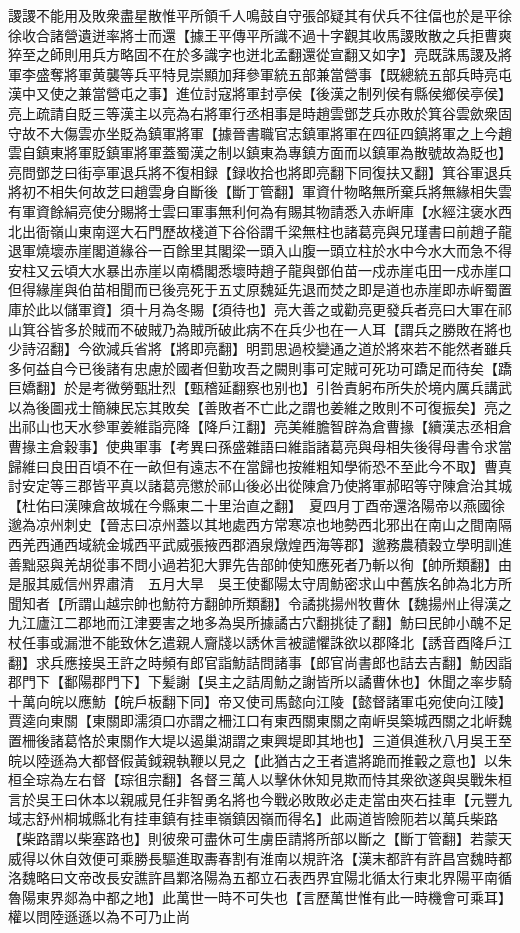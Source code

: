 謖謖不能用及敗衆盡星散惟平所領千人鳴鼓自守張郃疑其有伏兵不往偪也於是平徐徐收合諸營遺迸率將士而還【據王平傳平所識不過十字觀其收馬謖敗散之兵拒曹爽猝至之師則用兵方略固不在於多識字也迸北孟翻還從宣翻又如字】亮既誅馬謖及將軍李盛奪將軍黄襲等兵平特見崇顯加拜參軍統五部兼當營事【既總統五部兵時亮屯漢中又使之兼當營屯之事】進位討寇將軍封亭侯【後漢之制列侯有縣侯鄉侯亭侯】亮上疏請自貶三等漢主以亮為右將軍行丞相事是時趙雲鄧芝兵亦敗於箕谷雲歛衆固守故不大傷雲亦坐貶為鎮軍將軍【據晉書職官志鎮軍將軍在四征四鎮將軍之上今趙雲自鎮東將軍貶鎮軍將軍蓋蜀漢之制以鎮東為專鎮方面而以鎮軍為散號故為貶也】亮問鄧芝曰街亭軍退兵將不復相録【録收拾也將即亮翻下同復扶又翻】箕谷軍退兵將初不相失何故芝曰趙雲身自斷後【斷丁管翻】軍資什物略無所棄兵將無緣相失雲有軍資餘絹亮使分賜將士雲曰軍事無利何為有賜其物請悉入赤㟁庫【水經注褒水西北出衙嶺山東南逕大石門歷故棧道下谷俗謂千梁無柱也諸葛亮與兄瑾書曰前趙子龍退軍燒壞赤崖閣道緣谷一百餘里其閣梁一頭入山腹一頭立柱於水中今水大而急不得安柱又云頃大水暴出赤崖以南橋閣悉壞時趙子龍與鄧伯苗一戍赤崖屯田一戍赤崖口但得緣崖與伯苗相聞而已後亮死于五丈原魏延先退而焚之即是道也赤崖即赤㟁蜀置庫於此以儲軍資】須十月為冬賜【須待也】亮大善之或勸亮更發兵者亮曰大軍在祁山箕谷皆多於賊而不破賊乃為賊所破此病不在兵少也在一人耳【謂兵之勝敗在將也少詩沼翻】今欲減兵省將【將即亮翻】明罰思過校變通之道於將來若不能然者雖兵多何益自今已後諸有忠慮於國者但勤攻吾之闕則事可定賊可死功可蹻足而待矣【蹻巨嬌翻】於是考微勞甄壯烈【甄稽延翻察也别也】引咎責躬布所失於境内厲兵講武以為後圖戎士簡練民忘其敗矣【善敗者不亡此之謂也姜維之敗則不可復振矣】亮之出祁山也天水參軍姜維詣亮降【降戶江翻】亮美維膽智辟為倉曹掾【續漢志丞相倉曹掾主倉穀事】使典軍事【考異曰孫盛雜語曰維詣諸葛亮與母相失後得母書令求當歸維曰良田百頃不在一畝但有遠志不在當歸也按維粗知學術恐不至此今不取】曹真討安定等三郡皆平真以諸葛亮懲於祁山後必出從陳倉乃使將軍郝昭等守陳倉治其城【杜佑曰漢陳倉故城在今縣東二十里治直之翻】　夏四月丁酉帝還洛陽帝以燕國徐邈為凉州刺史【晉志曰凉州蓋以其地處西方常寒凉也地勢西北邪出在南山之間南隔西羌西通西域統金城西平武威張掖西郡酒泉燉煌西海等郡】邈務農積穀立學明訓進善黜惡與羌胡從事不問小過若犯大罪先告部帥使知應死者乃斬以徇【帥所類翻】由是服其威信州界肅清　五月大旱　吳王使鄱陽太守周魴密求山中舊族名帥為北方所聞知者【所謂山越宗帥也魴符方翻帥所類翻】令譎挑揚州牧曹休【魏揚州止得漢之九江廬江二郡地而江津要害之地多為吳所據譎古穴翻挑徒了翻】魴曰民帥小醜不足杖任事或漏泄不能致休乞遣親人齎牋以誘休言被譴懼誅欲以郡降北【誘音酉降戶江翻】求兵應接吳王許之時頻有郎官詣魴詰問諸事【郎官尚書郎也詰去吉翻】魴因詣郡門下【鄱陽郡門下】下髪謝【吳主之詰周魴之謝皆所以譎曹休也】休聞之率步騎十萬向皖以應魴【皖戶板翻下同】帝又使司馬懿向江陵【懿督諸軍屯宛使向江陵】賈逵向東關【東關即濡須口亦謂之柵江口有東西關東關之南㟁吳築城西關之北㟁魏置柵後諸葛恪於東關作大堤以遏巢湖謂之東興堤即其地也】三道俱進秋八月吳王至皖以陸遜為大都督假黃鉞親執鞭以見之【此猶古之王者遣將跪而推轂之意也】以朱桓全琮為左右督【琮徂宗翻】各督三萬人以擊休休知見欺而恃其衆欲遂與吳戰朱桓言於吳王曰休本以親戚見任非智勇名將也今戰必敗敗必走走當由夾石挂車【元豐九域志舒州桐城縣北有挂車鎮有挂車嶺鎮因嶺而得名】此兩道皆險阨若以萬兵柴路【柴路謂以柴塞路也】則彼衆可盡休可生虜臣請將所部以斷之【斷丁管翻】若蒙天威得以休自效便可乘勝長驅進取夀春割有淮南以規許洛【漢末都許有許昌宫魏時都洛魏略曰文帝改長安譙許昌鄴洛陽為五都立石表西界宜陽北循太行東北界陽平南循魯陽東界郯為中都之地】此萬世一時不可失也【言歷萬世惟有此一時機會可乘耳】權以問陸遜遜以為不可乃止尚